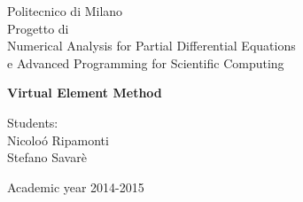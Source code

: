 \documentclass[oneside,12pt]{book}  %
\theoremstyle{plain}
\theoremstyle{definition}
\theoremstyle{remark}
\numberwithin{equation}{chapter} %
\begin{document}
\lstset{language=Matlab} 

\thispagestyle{empty}  %
\begin{center}  %
  {\Large Politecnico di Milano}\\[12pt]    %

  {\Huge Progetto di \\
  Numerical Analysis for Partial Differential Equations\\
  e Advanced Programming for Scientific Computing }
\end{center}


\begin{center}    %
  \Huge \bf Virtual Element Method
\end{center}
%
\vspace{12pt}
%
\begin{flushleft}
  \noindent\Large
  Students:\\
  Nicolo\'o Ripamonti \\
  Stefano Savar\`e\\
  
\end{flushleft}
%
%
\vspace{364pt}
%
\begin{center}
  \large
  Academic year 2014-2015
\end{center}

\newpage

\tableofcontents  %




\renewcommand{\baselinestretch}{1.5} %

 
\end{document}
